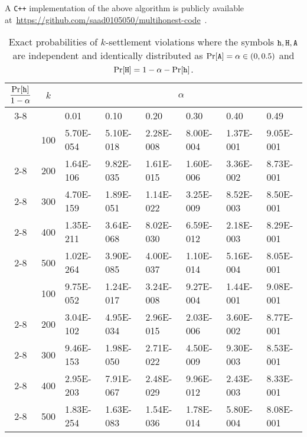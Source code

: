 A \texttt{C++} implementation of the above algorithm is publicly available 
at~\href{https://github.com/saad0105050/multihonest-code}{https://github.com/saad0105050/multihonest-code}~\cite{PrForkableMultihonestCode}.



\newcommand{\EndRow}{\cline{2-8} \multicolumn{1}{|c||}{} &}


\begin{table}[t]
	\centering
	\caption{
    Exact probabilities of $k$-settlement violations 
    where the symbols $\mathtt{h}, \mathtt{H}, \mathtt{A}$ are independent and identically distributed as $\Pr[\mathtt{A}] = \alpha \in (0, 0.5)$ and $\Pr[\mathtt{H}] = 1 - \alpha - \Pr[\mathtt{h}]$.    
	} 
	\label{table:exact-probs}


	\begin{tabular}{|c||l||l|l|l|l|l|l|}
    \hline
    \multirow{2}{*}{$\dfrac{\Pr[\mathtt{h}]}{1-\alpha}$} & 
  	\multicolumn{1}{|c||}{\multirow{2}{*}{$k$}} & 
    \multicolumn{6}{c|}{$\alpha$} \\ 
    \cline{3-8} 
    \multicolumn{1}{|c||}{} &
  	\multicolumn{1}{|c||}{} &
    0.01 & 0.10 & 0.20 & 0.30 & 0.40 & 0.49\\ 
  	\hhline{|=#=#=|=|=|=|=|=|}
    \multicolumn{1}{|c||}{\multirow{5}{*}{$1.0$}}&
    100 & 5.70E-054 & 5.10E-018 & 2.28E-008 & 8.00E-004 & 1.37E-001 & 9.05E-001 \\ \EndRow
    200 & 1.64E-106 & 9.82E-035 & 1.61E-015 & 1.60E-006 & 3.36E-002 & 8.73E-001 \\ \EndRow
    300 & 4.70E-159 & 1.89E-051 & 1.14E-022 & 3.25E-009 & 8.52E-003 & 8.50E-001 \\ \EndRow
    400 & 1.35E-211 & 3.64E-068 & 8.02E-030 & 6.59E-012 & 2.18E-003 & 8.29E-001 \\ \EndRow
    500 & 1.02E-264 & 3.90E-085 & 4.00E-037 & 1.10E-014 & 5.16E-004 & 8.05E-001 \\%

  
    \hhline{|=#=#=|=|=|=|=|=|}
    \multicolumn{1}{|c||}{\multirow{5}{*}{$0.9$}}&
    100 & 9.75E-052 & 1.24E-017 & 3.24E-008 & 9.27E-004 & 1.44E-001 & 9.08E-001   \\ \EndRow
    200 & 3.04E-102 & 4.95E-034 & 2.96E-015 & 2.03E-006 & 3.60E-002 & 8.77E-001   \\ \EndRow
    300 & 9.46E-153 & 1.98E-050 & 2.71E-022 & 4.50E-009 & 9.30E-003 & 8.53E-001   \\ \EndRow
    400 & 2.95E-203 & 7.91E-067 & 2.48E-029 & 9.96E-012 & 2.43E-003 & 8.33E-001   \\ \EndRow
    500 & 1.83E-254 & 1.63E-083 & 1.54E-036 & 1.78E-014 & 5.80E-004 & 8.08E-001   \\%


\end{tabular}
\end{table}

